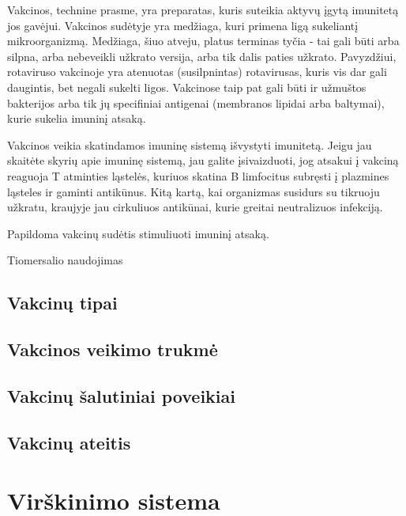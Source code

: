 \documentclass[]{book}
\begin{document}
Vakcinos, technine prasme, yra preparatas, kuris suteikia aktyvų įgytą imunitetą jos gavėjui. Vakcinos sudėtyje yra medžiaga, kuri primena ligą sukeliantį mikroorganizmą. Medžiaga, šiuo atveju, platus terminas tyčia - tai gali būti arba silpna, arba nebeveikli užkrato versija, arba tik dalis paties užkrato. Pavyzdžiui, rotaviruso vakcinoje yra atenuotas (susilpnintas) rotavirusas, kuris vis dar gali daugintis, bet negali sukelti ligos. Vakcinose taip pat gali būti ir užmuštos bakterijos arba tik jų specifiniai antigenai (membranos lipidai arba baltymai), kurie sukelia imuninį atsaką.

Vakcinos veikia skatindamos imuninę sistemą išvystyti imunitetą. Jeigu jau skaitėte skyrių apie imuninę sistemą, jau galite įsivaizduoti, jog atsakui į vakciną reaguoja T atminties ląstelės, kuriuos skatina B limfocitus subręsti į plazmines ląsteles ir gaminti antikūnus. Kitą kartą, kai organizmas susidurs su tikruoju užkratu, kraujyje jau cirkuliuos antikūnai, kurie greitai neutralizuos infekciją.

Papildoma vakcinų sudėtis stimuliuoti imuninį atsaką.

Tiomersalio naudojimas

\hypertarget{vakcinu-tipai}{%
\section{Vakcinų tipai}\label{vakcinu-tipai}}

\hypertarget{vakcinos-veikimo-trukme}{%
\section{Vakcinos veikimo trukmė}\label{vakcinos-veikimo-trukme}}

\hypertarget{vakcinu-salutiniai-poveikiai}{%
\section{Vakcinų šalutiniai poveikiai}\label{vakcinu-salutiniai-poveikiai}}

\hypertarget{vakcinu-ateitis}{%
\section{Vakcinų ateitis}\label{vakcinu-ateitis}}

\hypertarget{virskinimo-sistema}{%
\chapter{Virškinimo sistema}\label{virskinimo-sistema}}
\end{document}
